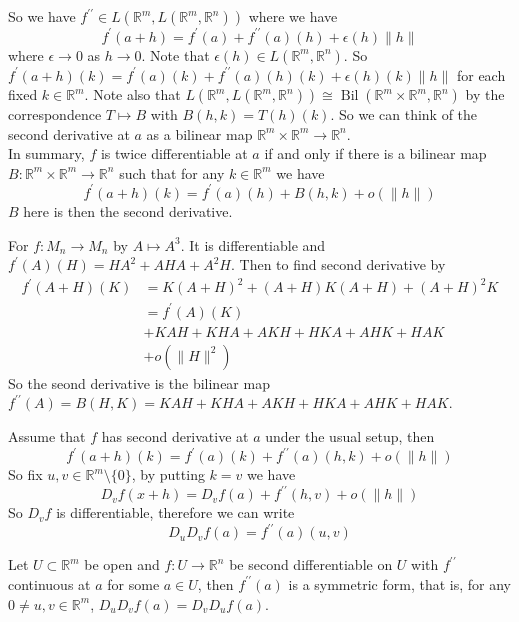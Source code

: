 So we have $f^{\prime\prime}\in L(\mathbb R^m,L(\mathbb R^m,\mathbb R^n))$ where we have
$$f^\prime(a+h)=f^\prime(a)+f^{\prime\prime}(a)(h)+\epsilon(h)\|h\|$$
where $\epsilon\to 0$ as $h\to 0$.
Note that $\epsilon(h)\in L(\mathbb R^m,\mathbb R^n)$.
So $f^\prime(a+h)(k)=f^\prime(a)(k)+f^{\prime\prime}(a)(h)(k)+\epsilon(h)(k)\|h\|$
for each fixed $k\in\mathbb R^m$.
Note also that $L(\mathbb R^m,L(\mathbb R^m,\mathbb R^n))\cong \operatorname{Bil}(\mathbb R^m\times\mathbb R^m,\mathbb R^n)$ by the correspondence $T\mapsto B$ with $B(h,k)=T(h)(k)$.
So we can think of the second derivative at $a$ as a bilinear map $\mathbb R^m\times\mathbb R^m\to\mathbb R^n$.\\
In summary, $f$ is twice differentiable at $a$ if and only if there is a bilinear map $B:\mathbb R^m\times\mathbb R^m\to\mathbb R^n$ such that for any $k\in\mathbb R^m$ we have
$$f^\prime(a+h)(k)=f^\prime(a)(h)+B(h,k)+o(\|h\|)$$
$B$ here is then the second derivative.
\begin{example}
    For $f:M_n\to M_n$ by $A\mapsto A^3$.
    It is differentiable and $f^\prime(A)(H)=HA^2+AHA+A^2H$.
    Then to find second derivative by
    \begin{align*}
        f^\prime(A+H)(K)&=K(A+H)^2+(A+H)K(A+H)+(A+H)^2K\\
        &=f^\prime(A)(K)\\
        &+KAH+KHA+AKH+HKA+AHK+HAK\\
        &+o(\|H\|^2)
    \end{align*}
    So the seond derivative is the bilinear map $f^{\prime\prime}(A)=B(H,K)=KAH+KHA+AKH+HKA+AHK+HAK$.
\end{example}
Assume that $f$ has second derivative at $a$ under the usual setup, then
$$f^\prime(a+h)(k)=f^\prime(a)(k)+f^{\prime\prime}(a)(h,k)+o(\|h\|)$$
So fix $u,v\in\mathbb R^m\setminus\{0\}$, by putting $k=v$ we have
$$D_vf(x+h)=D_vf(a)+f^{\prime\prime}(h,v)+o(\|h\|)$$
So $D_vf$ is differentiable, therefore we can write
$$D_uD_vf(a)=f^{\prime\prime}(a)(u,v)$$
\begin{theorem}
    Let $U\subset\mathbb R^m$ be open and $f:U\to\mathbb R^n$ be second differentiable on $U$ with $f^{\prime\prime}$ continuous at $a$ for some $a\in U$, then $f^{\prime\prime}(a)$ is a symmetric form, that is, for any $0\neq u,v\in\mathbb R^m$, $D_uD_vf(a)=D_vD_uf(a)$.
\end{theorem}
